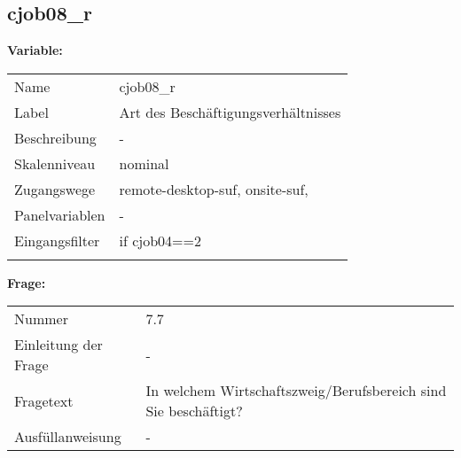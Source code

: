 	
	
	\subsection{cjob08\_r}
	\label{subSection:cjob08_r}

	\noindent\textbf{Variable:}\\
		\begin{tabular}{lL{11.3cm}}
			\label{tableVariable:cjob08_r}
			Name & cjob08\_r \\
			Label & Art des Beschäftigungsverhältnisses \\
			Beschreibung & - \\
			Skalenniveau & nominal \\
			Zugangswege &
				remote-desktop-suf,
				onsite-suf,
 \\
			Panelvariablen & -
			 \\
			Eingangsfilter & if cjob04==2 \\
 \\
		\end{tabular}

		\vspace*{1 cm}
		\noindent\textbf{Frage:}\\
		\begin{tabular}{lL{11.3cm}}
			\label{tableQuestion:cjob08_r}
			Nummer & 7.7 \\
			Einleitung der Frage & - \\
			Fragetext & In welchem Wirtschaftszweig/Berufsbereich sind Sie beschäftigt? \\
			Ausfüllanweisung & - \\
		\end{tabular}





